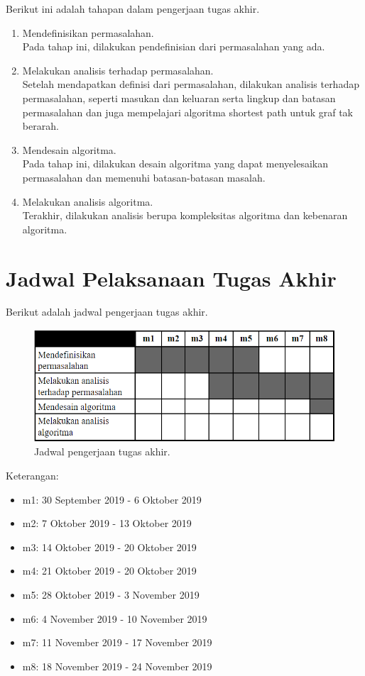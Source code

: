 Berikut ini adalah tahapan dalam pengerjaan tugas akhir.

\begin{enumerate}
    \item Mendefinisikan permasalahan.\\
    Pada tahap ini, dilakukan pendefinisian dari permasalahan yang ada.
    \item Melakukan analisis terhadap permasalahan.\\
    Setelah mendapatkan definisi dari permasalahan, dilakukan analisis terhadap permasalahan, seperti masukan dan keluaran serta lingkup dan batasan permasalahan dan juga mempelajari algoritma shortest path untuk graf tak berarah.
    \item Mendesain algoritma.\\
    Pada tahap ini, dilakukan desain algoritma yang dapat menyelesaikan permasalahan dan memenuhi batasan-batasan masalah.
    \item Melakukan analisis algoritma.\\
    Terakhir, dilakukan analisis berupa kompleksitas algoritma dan kebenaran algoritma.
\end{enumerate}

\section{Jadwal Pelaksanaan Tugas Akhir}

Berikut adalah jadwal pengerjaan tugas akhir.

\begin{figure}[h]
    \centering
    \includegraphics[width=1.0\textwidth]{resources/jadwa_pengerjaan.png}
    \caption{Jadwal pengerjaan tugas akhir.}
\end{figure}

Keterangan:
\begin{itemize}
    \item m1: 30 September 2019 - 6 Oktober 2019
    \item m2: 7 Oktober 2019 - 13 Oktober 2019
    \item m3: 14 Oktober 2019 - 20 Oktober 2019
    \item m4: 21 Oktober 2019 - 20 Oktober 2019
    \item m5: 28 Oktober 2019 - 3 November 2019
    \item m6: 4 November 2019 - 10 November 2019
    \item m7: 11 November 2019 - 17 November 2019
    \item m8: 18 November 2019 - 24 November 2019
\end{itemize}

